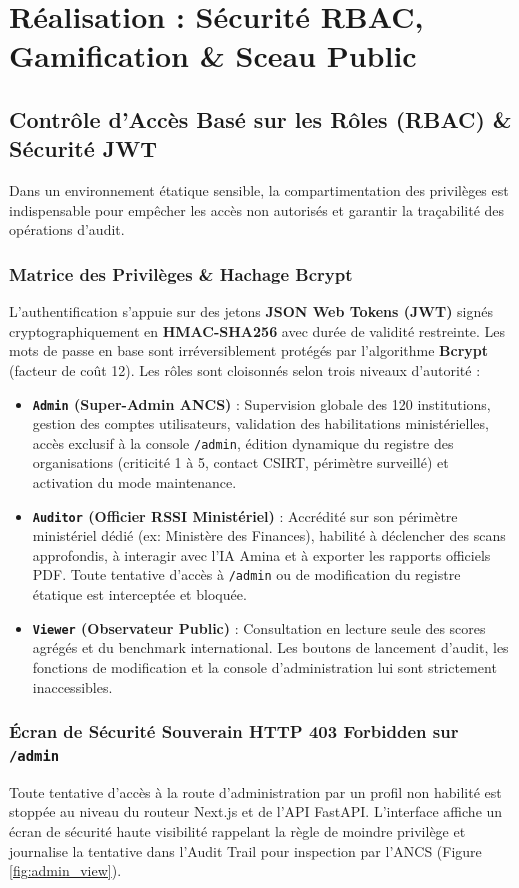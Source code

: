 \chapter[Sécurité RBAC \& Gamification]{Réalisation : Sécurité RBAC, Gamification \& Sceau Public}
\label{chap:backend_gamification}

\section{Contrôle d'Accès Basé sur les Rôles (RBAC) \& Sécurité JWT}
Dans un environnement étatique sensible, la compartimentation des privilèges est indispensable pour empêcher les accès non autorisés et garantir la traçabilité des opérations d'audit.

\subsection{Matrice des Privilèges \& Hachage Bcrypt}
L'authentification s'appuie sur des jetons \textbf{JSON Web Tokens (JWT)} signés cryptographiquement en \textbf{HMAC-SHA256} avec durée de validité restreinte. Les mots de passe en base sont irréversiblement protégés par l'algorithme \textbf{Bcrypt} (facteur de coût 12). Les rôles sont cloisonnés selon trois niveaux d'autorité :
\begin{itemize}
    \item \textbf{\texttt{Admin} (Super-Admin ANCS)} : Supervision globale des 120 institutions, gestion des comptes utilisateurs, validation des habilitations ministérielles, accès exclusif à la console \texttt{/admin}, édition dynamique du registre des organisations (criticité 1 à 5, contact CSIRT, périmètre surveillé) et activation du mode maintenance.
    \item \textbf{\texttt{Auditor} (Officier RSSI Ministériel)} : Accrédité sur son périmètre ministériel dédié (ex: Ministère des Finances), habilité à déclencher des scans approfondis, à interagir avec l'IA Amina et à exporter les rapports officiels PDF. Toute tentative d'accès à \texttt{/admin} ou de modification du registre étatique est interceptée et bloquée.
    \item \textbf{\texttt{Viewer} (Observateur Public)} : Consultation en lecture seule des scores agrégés et du benchmark international. Les boutons de lancement d'audit, les fonctions de modification et la console d'administration lui sont strictement inaccessibles.
\end{itemize}

\subsection{Écran de Sécurité Souverain HTTP 403 Forbidden sur \texttt{/admin}}
Toute tentative d'accès à la route d'administration par un profil non habilité est stoppée au niveau du routeur Next.js et de l'API FastAPI. L'interface affiche un écran de sécurité haute visibilité rappelant la règle de moindre privilège et journalise la tentative dans l'Audit Trail pour inspection par l'ANCS (Figure \ref{fig:admin_view}).

